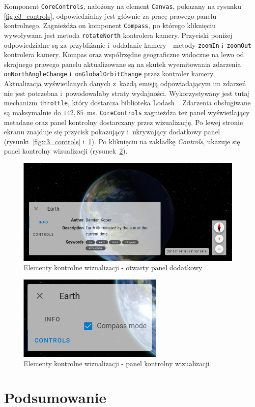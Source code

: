 Komponent \texttt{CoreControls}, nałożony na element \texttt{Canvas}, pokazany na rysunku \ref{fig:c3_controls}, odpowiedzialny jest głównie za pracę prawego panelu kontrolnego. Zagnieżdża on komponent \texttt{Compass}, po którego kliknięciu wywoływana jest metoda \texttt{rotateNorth} kontrolera kamery. Przyciski poniżej odpowiedzialne są za przybliżanie i~oddalanie kamery - metody \texttt{zoomIn} i~\texttt{zoomOut} kontrolera kamery. Kompas oraz współrzędne geograficzne widoczne na lewo od skrajnego prawego panelu aktualizowane są na skutek wyemitowania zdarzenia \texttt{onNorthAngleChange} i~\texttt{onGlobalOrbitChange} przez kontroler kamery. Aktualizacja wyświetlanych danych z~każdą emisją odpowiadającym im zdarzeń nie jest potrzebna i~powodowałaby straty wydajności. Wykorzystywany jest tutaj mechanizm \texttt{throttle}, który dostarcza biblioteka Lodash~\cite{lodash}. Zdarzenia obsługiwane są maksymalnie do  $142,85$~ms. 
\texttt{CoreControls} zagnieżdża też panel wyświetlający metadane oraz panel kontrolny dostarczany przez wizualizację. Po lewej stronie ekranu znajduje się przycisk pokazujący i~ukrywający dodatkowy panel (rysunki~\ref{fig:c3_controls} i~\ref{fig:c3_controls_open}). Po kliknięciu na zakładkę \textit{Controls}, ukazuje się panel kontrolny wizualizacji (rysunek~\ref{fig:c3_controls_earth}).


\begin{figure}
    \centering
    \includegraphics[width=\linewidth]{img/c3_controls_open.png}
    \caption{Elementy kontrolne wizualizacji - otwarty panel dodatkowy}
    \label{fig:c3_controls_open}
\end{figure}

\begin{figure}
    \centering
    \includegraphics[scale=2.1]{img/c3_controls_earth.png}
    \caption{Elementy kontrolne wizualizacji - panel kontrolny wizualizacji}
    \label{fig:c3_controls_earth} 
\end{figure}

\section{Podsumowanie}

